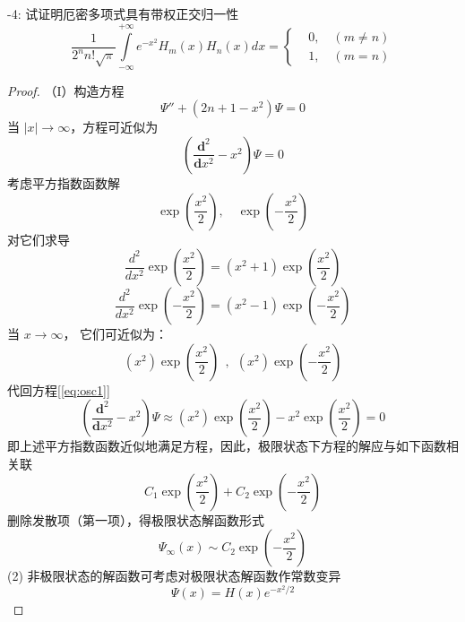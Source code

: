 \begin{proposition}-4:
	试证明厄密多项式具有带权正交归一性
	\[ \frac{1}{2^n n! \sqrt{\pi} }\int\limits_{-\infty}^{+\infty} e^{-x^{2}} H_m(x) H_n(x)dx = \left\{ 
		\begin{aligned}
			& 0, \quad (m\ne n) \\ 
			& 1, \quad (m= n)
		\end{aligned}\right.\]
\end{proposition}
\begin{proof}
	（I）构造方程
	$$\Psi'' +(2n+1-x^2) \Psi =0 $$ 
	当 $ |x| \to \infty$，方程可近似为
		 \begin{equation}\label{eq:osc1}
			 \left(\frac{\mathbf{d} ^2}{\mathbf{d} x^2} - x^2 \right) \Psi=0 
		 \end{equation} 
		 考虑平方指数函数解
		 $$ \exp(\frac{x ^2}{2}), \quad \exp(-\frac{x ^2}{2})  $$ 
		 对它们求导
		 \begin{equation*}
			 \frac{d^2 }{d x ^2} \exp(\frac{x ^2}{2}) =(x ^2 +1)  \exp(\frac{x ^2}{2}) 
		 \end{equation*}    
		 \begin{equation*}
			 \frac{d^2 }{d x ^2} \exp( - \frac{x ^2}{2}) =(x ^2 -1)  \exp( - \frac{x ^2}{2}) 
		 \end{equation*}  
		 当 $ x \to \infty$， 它们可近似为：\\
		 \begin{equation*}
			 (x ^2 )  \exp( \frac{x ^2}{2}) ~~, ~~ (x ^2 )  \exp( - \frac{x ^2}{2}) 
		 \end{equation*} 
		 代回方程[\ref{eq:osc1}]
		 \begin{equation*}
			 \left(\frac{\mathbf{d} ^2}{\mathbf{d} x^2} - x^2 \right) \Psi \approx (x ^2 )  \exp( \frac{x ^2}{2}) - x ^2   \exp( \frac{x ^2}{2}) =0 
		 \end{equation*}
		 即上述平方指数函数近似地满足方程，因此，极限状态下方程的解应与如下函数相关联
		 \begin{equation*}
			 C_1  \exp( \frac{x ^2}{2}) + C_2   \exp( - \frac{x ^2}{2})  
		 \end{equation*}     
		 删除发散项（第一项），得极限状态解函数形式 \\
		 \begin{equation*}
			 \Psi_\infty (x)  \sim C_2 \exp( - \frac{x ^2}{2})  
		 \end{equation*}  
		 (2) 非极限状态的解函数可考虑对极限状态解函数作常数变异 
		 \begin{equation*}
			 \Psi(x) = H(x) e^{-x^2/2 }  
		 \end{equation*}   

\end{proof}
